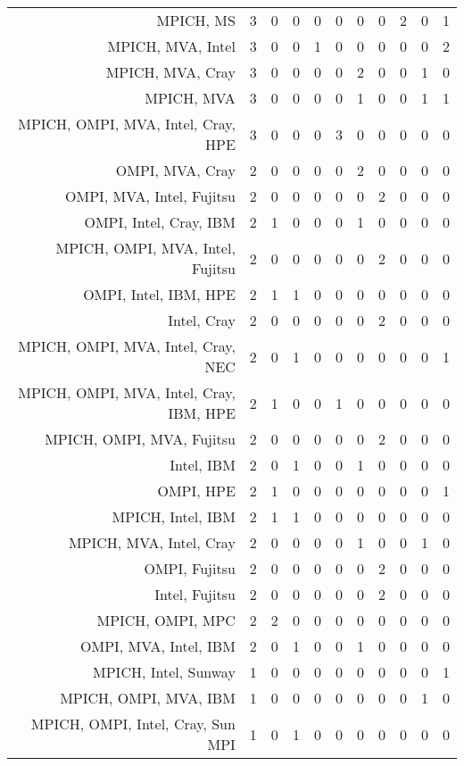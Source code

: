 {\begin{landscape}
\begin{longtable}[htb]{r|c|c|c|c|c|c|c|c|c|c}
{MPICH, MS} & 3 & 0 & 0 & 0 & 0 & 0 & 0 & 2 & 0 & 1 \\%
{MPICH, MVA, Intel} & 3 & 0 & 0 & 1 & 0 & 0 & 0 & 0 & 0 & 2 \\%
{MPICH, MVA, Cray} & 3 & 0 & 0 & 0 & 0 & 2 & 0 & 0 & 1 & 0 \\%
{MPICH, MVA} & 3 & 0 & 0 & 0 & 0 & 1 & 0 & 0 & 1 & 1 \\%
{MPICH, OMPI, MVA, Intel, Cray, HPE} & 3 & 0 & 0 & 0 & 3 & 0 & 0 & 0 & 0 & 0 \\%
{OMPI, MVA, Cray} & 2 & 0 & 0 & 0 & 0 & 2 & 0 & 0 & 0 & 0 \\%
{OMPI, MVA, Intel, Fujitsu} & 2 & 0 & 0 & 0 & 0 & 0 & 2 & 0 & 0 & 0 \\%
{OMPI, Intel, Cray, IBM} & 2 & 1 & 0 & 0 & 0 & 1 & 0 & 0 & 0 & 0 \\%
{MPICH, OMPI, MVA, Intel, Fujitsu} & 2 & 0 & 0 & 0 & 0 & 0 & 2 & 0 & 0 & 0 \\%
{OMPI, Intel, IBM, HPE} & 2 & 1 & 1 & 0 & 0 & 0 & 0 & 0 & 0 & 0 \\%
{Intel, Cray} & 2 & 0 & 0 & 0 & 0 & 0 & 2 & 0 & 0 & 0 \\%
{MPICH, OMPI, MVA, Intel, Cray, NEC} & 2 & 0 & 1 & 0 & 0 & 0 & 0 & 0 & 0 & 1 \\%
{MPICH, OMPI, MVA, Intel, Cray, IBM, HPE} & 2 & 1 & 0 & 0 & 1 & 0 & 0 & 0 & 0 & 0 \\%
{MPICH, OMPI, MVA, Fujitsu} & 2 & 0 & 0 & 0 & 0 & 0 & 2 & 0 & 0 & 0 \\%
{Intel, IBM} & 2 & 0 & 1 & 0 & 0 & 1 & 0 & 0 & 0 & 0 \\%
{OMPI, HPE} & 2 & 1 & 0 & 0 & 0 & 0 & 0 & 0 & 0 & 1 \\%
{MPICH, Intel, IBM} & 2 & 1 & 1 & 0 & 0 & 0 & 0 & 0 & 0 & 0 \\%
{MPICH, MVA, Intel, Cray} & 2 & 0 & 0 & 0 & 0 & 1 & 0 & 0 & 1 & 0 \\%
{OMPI, Fujitsu} & 2 & 0 & 0 & 0 & 0 & 0 & 2 & 0 & 0 & 0 \\%
{Intel, Fujitsu} & 2 & 0 & 0 & 0 & 0 & 0 & 2 & 0 & 0 & 0 \\%
{MPICH, OMPI, MPC} & 2 & 2 & 0 & 0 & 0 & 0 & 0 & 0 & 0 & 0 \\%
{OMPI, MVA, Intel, IBM} & 2 & 0 & 1 & 0 & 0 & 1 & 0 & 0 & 0 & 0 \\%
{MPICH, Intel, Sunway} & 1 & 0 & 0 & 0 & 0 & 0 & 0 & 0 & 0 & 1 \\%
{MPICH, OMPI, MVA, IBM} & 1 & 0 & 0 & 0 & 0 & 0 & 0 & 0 & 1 & 0 \\%
{MPICH, OMPI, Intel, Cray, Sun MPI} & 1 & 0 & 1 & 0 & 0 & 0 & 0 & 0 & 0 & 0 \\%

\end{longtable}
\end{landscape}}
